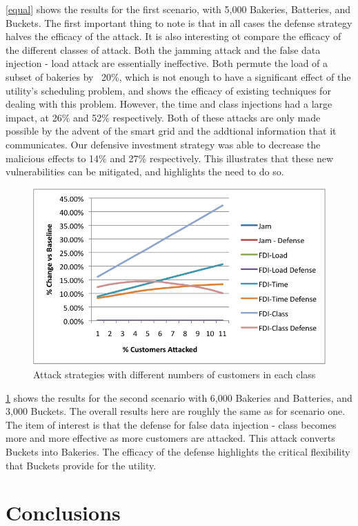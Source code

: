 \documentclass[conference]{IEEEtran}
\begin{document}
\ref{equal} shows the results for the first scenario, with 5,000 Bakeries, Batteries, and Buckets.  The first important thing to note is that in all cases the defense strategy halves the efficacy of the attack.  It is also interesting ot compare the efficacy of the different classes of attack.  Both the jamming attack and the false data injection - load attack are essentially ineffective.  Both permute the load of a subset of bakeries by ~20\%, which is not enough to have a significant effect of the utility's scheduling problem, and shows the efficacy of existing techniques for dealing with this problem.  However, the time and class injections had a large impact, at 26\% and 52\% respectively.  Both of these attacks are only made possible by the advent of the smart grid and the addtional information that it communicates.  Our defensive investment strategy was able to decrease the malicious effects to 14\% and 27\% respectively.  This illustrates that these new vulnerabilities can be mitigated, and highlights the need to do so.

\begin{figure}[!htbp]
\label{unequal}
\centering
\includegraphics[width=.5\textwidth]{unequal-attacks.png}
\caption{Attack strategies with different numbers of customers in each class}
\end{figure}

\ref{unequal} shows the results for the second scenario with 6,000 Bakeries and Batteries, and 3,000 Buckets.  The overall results here are roughly the same as for scenario one.  The item of interest is that the defense for false data injection - class becomes more and more effective as more customers are attacked.  This attack converts Buckets into Bakeries.  The efficacy of the defense highlights the critical flexibility that Buckets provide for the utility.


\section{Conclusions}
\label{Conclusions}
\end{document}

